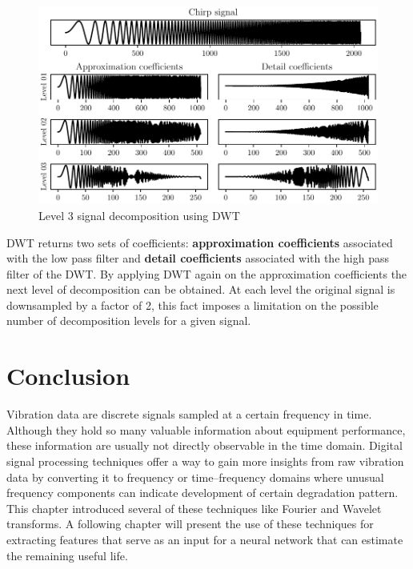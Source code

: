 \begin{figure}[H]
    \centering
    \includegraphics{figures/dwt_chirp.pdf}
    \caption{Level 3 signal decomposition using DWT}
    \label{fig:dwt-chirp-signal}
\end{figure}

DWT returns two sets of coefficients: \textbf{approximation coefficients} associated with the low pass filter and \textbf{detail coefficients} associated with the high pass filter of the DWT. By applying DWT again on the approximation coefficients the next level of decomposition can be obtained. At each level the original signal is downsampled by a factor of 2, this fact imposes a limitation on the possible number of decomposition levels for a given signal.

\section{Conclusion}
Vibration data are discrete signals sampled at a certain frequency in time. Although they hold so many valuable information about equipment performance, these information are usually not directly observable in the time domain. Digital signal processing techniques offer a way to gain more insights from raw vibration data by converting it to frequency or time–frequency domains where unusual frequency components can indicate development of certain degradation pattern. This chapter introduced several of these techniques like Fourier and Wavelet transforms. A following chapter will present the use of these techniques for extracting features that serve as an input for a neural network that can estimate the remaining useful life.